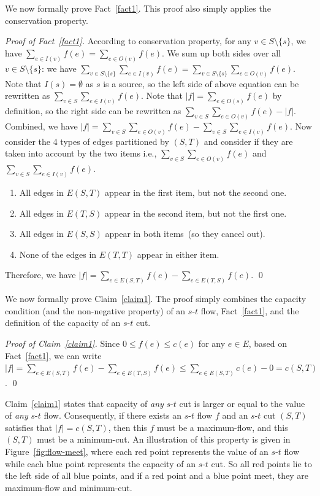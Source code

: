 We now formally prove Fact~\ref{fact1}. 
		This proof also simply applies the conservation property.

\emph{Proof of Fact~\ref{fact1}.} According to conservation property, for any $v\in S\setminus \{s\}$,
we have $\sum_{e\in I(v)} f(e) = \sum_{e\in O(v)} f(e)$. 
We sum up both sides over all $v\in S\setminus\{s\}$: 
we have $\sum_{v\in S\setminus\{s\}} \sum_{e\in I(v)} f(e) = \sum_{v\in S\setminus\{s\}} \sum_{e\in O(v)} f(e)$. 
Note that $I(s) = \emptyset$ as $s$ is a source, so the left side of above equation can be rewritten as $\sum_{v\in S} \sum_{e\in I(v)} f(e)$.
Note that $|f| = \sum_{e\in O(s)} f(e)$ by definition, so the right side can be rewritten as $\sum_{v\in S} \sum_{e\in O(v)} f(e) - |f|$.
Combined, we have $|f| = \sum_{v\in S} \sum_{e\in O(v)} f(e) - \sum_{v\in S} \sum_{e\in I(v)} f(e)$. 
Now consider the 4 types of edges partitioned by $(S, T)$ and consider if they are taken into account by the two items
i.e., $\sum_{v\in S} \sum_{e\in O(v)} f(e)$ and $\sum_{v\in S} \sum_{e\in I(v)} f(e)$. 
\begin{enumerate}
\item All edges in $E(S, T)$ appear in the first item, but not the second one.
\item All edges in $E(T, S)$ appear in the second item, but not the first one.
\item All edges in $E(S, S)$ appear in both items~(so they cancel out).
\item None of the edges in $E(T, T)$ appear in either item.
\end{enumerate}
Therefore, we have $|f| = \sum_{e\in E(S, T)} f(e) - \sum_{e\in E(T, S)} f(e)$. \qed

We now formally prove Claim~\ref{claim1}. The proof simply combines the capacity condition (and the non-negative property) of an $s$-$t$ flow,
Fact~\ref{fact1}, and the definition of the capacity of an $s$-$t$ cut.

\emph{Proof of Claim~\ref{claim1}.} Since $0\le f(e) \le c(e)$ for any $e\in E$,
based on Fact~\ref{fact1}, we can write
$|f| = \sum_{e\in E(S, T)} f(e) - \sum_{e\in E(T, S)} f(e)
\le \sum_{e\in E(S, T)} c(e) - 0 = c(S, T)$. \qed


Claim~\ref{claim1} states that capacity of \emph{any} $s$-$t$ cut
is larger or equal to the value of \emph{any} $s$-$t$ flow.
Consequently, if there exists an $s$-$t$ flow $f$ and an $s$-$t$ cut $(S,T)$
satisfies that $|f| = c(S, T)$, then this $f$ must be a maximum-flow,
and this $(S, T)$ must be a minimum-cut.
An illustration of this property is given in Figure~\ref{fig:flow-meet},
where each red point represents the value of an $s$-$t$ flow
while each blue point represents the capacity of an $s$-$t$ cut.
So all red points lie to the left side of all blue points,
and if a red point and a blue point meet, they are maximum-flow and minimum-cut.

